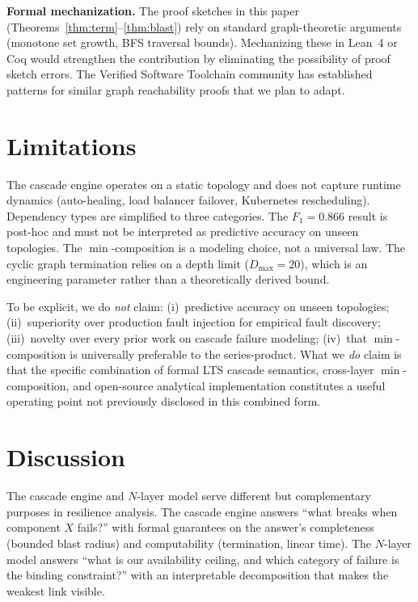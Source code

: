 \documentclass[conference,10pt]{IEEEtran}
\begin{document}
\textbf{Formal mechanization.}
The proof sketches in this paper (Theorems~\ref{thm:term}--\ref{thm:blast})
rely on standard graph-theoretic arguments (monotone set growth,
BFS traversal bounds). Mechanizing these in Lean~4 or Coq would
strengthen the contribution by eliminating the possibility of
proof sketch errors. The Verified Software Toolchain community
has established patterns for similar graph reachability proofs
that we plan to adapt.

\section{Limitations}

The cascade engine operates on a static topology and does not
capture runtime dynamics (auto-healing, load balancer failover,
Kubernetes rescheduling). Dependency types are simplified to three
categories. The $F_1 = 0.866$ result is post-hoc and must not be
interpreted as predictive accuracy on unseen topologies. The $\min$-composition is a
modeling choice, not a universal law. The cyclic graph termination
relies on a depth limit ($D_{\max} = 20$), which is an engineering
parameter rather than a theoretically derived bound.

To be explicit, we do \emph{not} claim: (i)~predictive accuracy
on unseen topologies; (ii)~superiority over production fault
injection for empirical fault discovery; (iii)~novelty over every
prior work on cascade failure modeling; (iv)~that
$\min$-composition is universally preferable to the series-product.
What we \emph{do} claim is that the specific combination of
formal LTS cascade semantics, cross-layer $\min$-composition,
and open-source analytical implementation constitutes a useful
operating point not previously disclosed in this combined form.

\section{Discussion}

The cascade engine and $N$-layer model serve different but
complementary purposes in resilience analysis.
The cascade engine answers ``what breaks when component $X$ fails?''
with formal guarantees on the answer's completeness (bounded blast
radius) and computability (termination, linear time).
The $N$-layer model answers ``what is our availability ceiling, and
which category of failure is the binding constraint?'' with an
interpretable decomposition that makes the weakest link visible.
\end{document}

